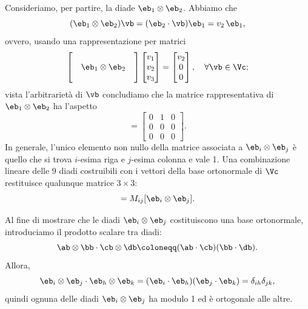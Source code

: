Consideriamo, per partire, la diade $\eb_1\otimes \eb_2$. Abbiamo che
\begin{equation}
(\eb_1\otimes \eb_2)\vb=(\eb_2\cdot \vb)\eb_1=v_2\,\eb_1,
\end{equation}
ovvero, usando una rappresentazione per matrici
\begin{equation}
	\begin{bmatrix}&&\\&\eb_{1}\otimes\eb_{2}&\\&&\end{bmatrix}\begin{bmatrix}v_{1}\\v_{2}\\v_{3}\end{bmatrix}=\begin{bmatrix}v_{2}\\0\\0\end{bmatrix},\quad\forall\vb\in \Vc;
\end{equation}
vista l'arbitrarietà di $\vb$ concludiamo che la matrice rappresentativa di $\eb_{1}\otimes\eb_2$ ha l'aspetto
\begin{equation}
[\eb_{1}\otimes\eb_2]=	\begin{bmatrix}0&1&0\\0&0&0\\0&0&0\end{bmatrix}.
\end{equation}
 In generale, l’unico elemento non nullo della matrice associata a $\eb_i \otimes \eb_j$ è quello che si trova $i$-esima riga e $j$-esima colonna e vale 1. Una combinazione lineare delle 9 diadi costruibili con i vettori della base ortonormale di $\Vc$ restituisce qualunque matrice $3\times 3$:
 \begin{equation}
 	[\mathbf{M}]=M_{ij}[\eb_i\otimes \eb_j].
 \end{equation}
 
 Al fine di mostrare che le diadi $\eb_i\otimes \eb_j$ costituiscono una base ortonormale, introduciamo il prodotto scalare tra diadi:
 \begin{equation}
 \ab \otimes \bb \cdot \cb \otimes \db \coloneqq (\ab \cdot \cb)(\bb\cdot \db).
 \end{equation}
 Allora,
 \begin{equation}
\eb_i\otimes\eb_j \cdot\eb_h \otimes \eb_k=(\eb_i\cdot\eb_h)(\eb_j\cdot\eb_k)=\delta_{ih}\delta_{jk},
 \end{equation}
quindi ognuna delle diadi $\eb_i\otimes \eb_j$ ha modulo 1 ed è ortogonale alle altre.

